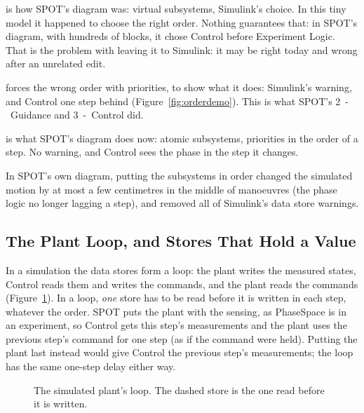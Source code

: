 \documentclass[11pt,a4paper]{article}
\newcommand{\fn}[1]{\texttt{#1}}
\begin{document}
\begin{description}[leftmargin=1.2em]
  \item[A] is how SPOT's diagram was: virtual subsystems, Simulink's choice. In this tiny model it happened to
        choose the right order. Nothing guarantees that: in SPOT's diagram, with hundreds of blocks, it chose
        Control before Experiment Logic. That is the problem with leaving it to Simulink: it may be right today
        and wrong after an unrelated edit.
  \item[B] forces the wrong order with priorities, to show what it does: Simulink's warning, and Control one
        step behind (Figure~\ref{fig:orderdemo}). This is what SPOT's 2~-~Guidance and 3~-~Control did.
  \item[C] is what SPOT's diagram does now: atomic subsystems, priorities in the order of a step. No warning,
        and Control sees the phase in the step it changes.
\end{description}
In SPOT's own diagram, putting the subsystems in order changed the simulated motion by at most a few
centimetres in the middle of manoeuvres (the phase logic no longer lagging a step), and removed all of
Simulink's data store warnings.

\subsection{The Plant Loop, and Stores That Hold a Value}\label{sec:plantloop}
In a simulation the data stores form a loop: the plant writes the measured states, Control reads them and
writes the commands, and the plant reads the commands (Figure~\ref{fig:plantloop}). In a loop, \emph{one}
store has to be read before it is written in each step, whatever the order. SPOT puts the plant with the
sensing, as PhaseSpace is in an experiment, so Control gets this step's measurements and the plant uses the
previous step's command for one step (as if the command were held). Putting the plant last instead would give
Control the previous step's measurements; the loop has the same one-step delay either way.

\begin{figure}[h]
\centering
{}
\caption{The simulated plant's loop. The dashed store is the one read before it is written.}
\label{fig:plantloop}
\end{figure}
\end{document}
